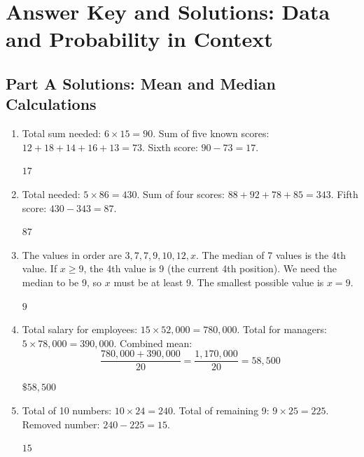 \documentclass[14pt]{extarticle}
\begin{document}
\newpage

\section*{Answer Key and Solutions: Data and Probability in Context}

\subsection*{Part A Solutions: Mean and Median Calculations}
\begin{enumerate}
  \item Total sum needed: \(6 \times 15 = 90\). Sum of five known scores: \(12 + 18 + 14 + 16 + 13 = 73\). Sixth score: \(90 - 73 = 17\).

  \(\boxed{17}\)

  \item Total needed: \(5 \times 86 = 430\). Sum of four scores: \(88 + 92 + 78 + 85 = 343\). Fifth score: \(430 - 343 = 87\).

  \(\boxed{87}\)

  \item The values in order are \(3, 7, 7, 9, 10, 12, x\). The median of 7 values is the 4th value. If \(x \geq 9\), the 4th value is 9 (the current 4th position). We need the median to be 9, so \(x\) must be at least 9. The smallest possible value is \(x = 9\).

  \(\boxed{9}\)

  \item Total salary for employees: \(15 \times 52{,}000 = 780{,}000\). Total for managers: \(5 \times 78{,}000 = 390{,}000\). Combined mean:
  \[
  \frac{780{,}000 + 390{,}000}{20} = \frac{1{,}170{,}000}{20} = 58{,}500
  \]

  \(\boxed{\$58{,}500}\)

  \item Total of 10 numbers: \(10 \times 24 = 240\). Total of remaining 9: \(9 \times 25 = 225\). Removed number: \(240 - 225 = 15\).

  \(\boxed{15}\)
\end{enumerate}
\end{document}
